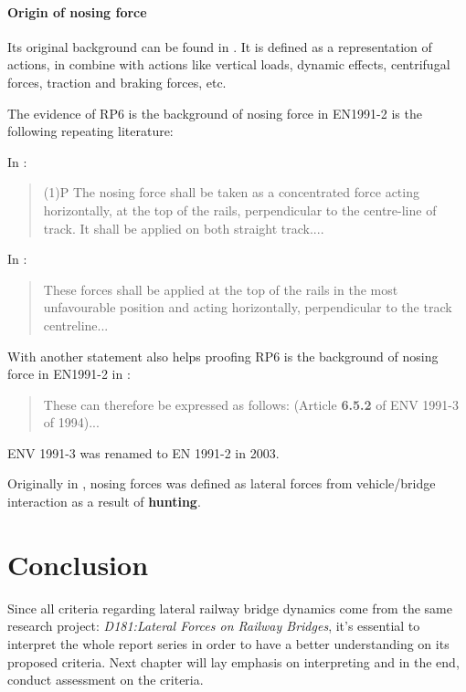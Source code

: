 \paragraph{Origin of nosing force}
Its original background can be found in \citet[Proposed criteria]{d181}. It is defined as a representation of actions, in combine with actions like vertical loads, dynamic effects, centrifugal forces, traction and braking forces, etc.

The evidence of RP6 is the background of nosing force in EN1991-2 is the following repeating literature:

In \citet[6.5.2]{EC12}:
\begin{quote}
	(1)P The nosing force shall be taken as a concentrated force acting horizontally, at the top of the rails, perpendicular to the centre-line of track. It shall be applied on both straight track....
\end{quote}

In \citet[4.1B]{d181}:
\begin{quote}
	These forces shall be applied at the top of the rails in the most unfavourable position and acting horizontally, perpendicular to the track centreline...
\end{quote}

With another statement also helps proofing RP6 is the background of nosing force in EN1991-2 in \citet[4:Draft Recommendations]{d181}:

\begin{quote}
	These can therefore be expressed as follows: (Article \textbf{6.5.2} of ENV 1991-3 of 1994)...
\end{quote}

ENV 1991-3 was renamed to EN 1991-2 in 2003.

Originally in \citet[4:Draft Recommendations]{d181}, nosing forces was defined as lateral forces from vehicle/bridge interaction as a result of \textbf{hunting}.

\section{Conclusion}
Since all criteria regarding lateral railway bridge dynamics come from the same research project: \textit{D181:Lateral Forces on Railway Bridges}, it's essential to interpret the whole report series in order to have a better understanding on its proposed criteria. Next chapter will lay emphasis on interpreting and in the end, conduct assessment on the criteria.


